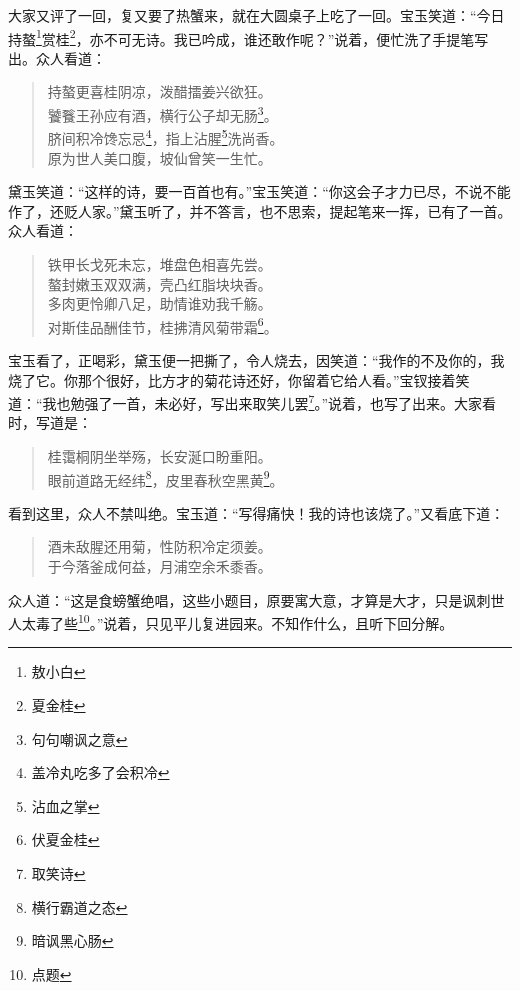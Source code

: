 \documentclass[12pt,oneside]{book}
\newenvironment{shici}{%
\begin{verse}%
\centering\large\hspace{12pt}}%
{\end{verse}}
\begin{document}
大家又评了一回，复又要了热蟹来，就在大圆桌子上吃了一回。宝玉笑道：“今日持螯\footnote{敖小白}赏桂\footnote{夏金桂}，亦不可无诗。我已吟成，谁还敢作呢？”说着，便忙洗了手提笔写出。众人看道：

\begin{shici}
持螯更喜桂阴凉，泼醋擂姜兴欲狂。\\
饕餮王孙应有酒，横行公子却无肠\footnote{句句嘲讽之意}。\\
脐间积冷馋忘忌\footnote{盖冷丸吃多了会积冷}，指上沾腥\footnote{沾血之掌}洗尚香。\\
原为世人美口腹，坡仙曾笑一生忙。
\end{shici}


黛玉笑道：“这样的诗，要一百首也有。”宝玉笑道：“你这会子才力已尽，不说不能作了，还贬人家。”黛玉听了，并不答言，也不思索，提起笔来一挥，已有了一首。众人看道：

\begin{shici}
铁甲长戈死未忘，堆盘色相喜先尝。\\
螯封嫩玉双双满，壳凸红脂块块香。\\
多肉更怜卿八足，助情谁劝我千觞。\\
对斯佳品酬佳节，桂拂清风菊带霜\footnote{伏夏金桂}。
\end{shici}


宝玉看了，正喝彩，黛玉便一把撕了，令人烧去，因笑道：“我作的不及你的，我烧了它。你那个很好，比方才的菊花诗还好，你留着它给人看。”宝钗接着笑道：“我也勉强了一首，未必好，写出来取笑儿罢\footnote{取笑诗}。”说着，也写了出来。大家看时，写道是：

\begin{shici}
桂霭桐阴坐举殇，长安涎口盼重阳。\\
眼前道路无经纬\footnote{横行霸道之态}，皮里春秋空黑黄\footnote{暗讽黑心肠}。
\end{shici}


看到这里，众人不禁叫绝。宝玉道：“写得痛快！我的诗也该烧了。”又看底下道：

\begin{shici}
酒未敌腥还用菊，性防积冷定须姜。\\
于今落釜成何益，月浦空余禾黍香。
\end{shici}


众人道：“这是食螃蟹绝唱，这些小题目，原要寓大意，才算是大才，只是讽刺世人太毒了些\footnote{点题}。”说着，只见平儿复进园来。不知作什么，且听下回分解。


 
\end{document}
